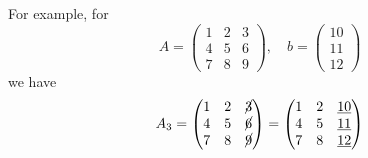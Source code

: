 \documentclass[8pt]{article} %
\begin{document}
For example, for \[A=\begin{pmatrix}1&2&3\\4&5&6\\7&8&9\end{pmatrix},\quad b=\begin{pmatrix}10\\11\\12\end{pmatrix}\]
we have
\[A_3=
\begin{pmatrix}1&2&\cancel{3}\\4&5&{\cancel{6}}\\7&8&\cancel{9}\end{pmatrix}=
\begin{pmatrix}1&2&\uline{10}\\4&5&{\uline{11}}\\7&8&\uline{12}\end{pmatrix}\]
\end{document}
